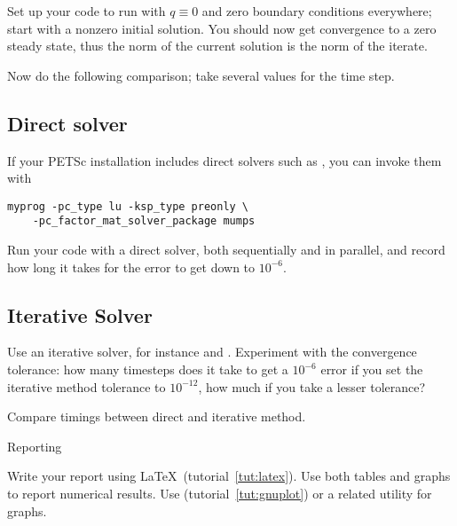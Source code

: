 Set up your code to run with $q\equiv0$ and zero boundary
  conditions everywhere; start with a nonzero initial solution. You
  should now get convergence to a zero steady state, thus the norm of
  the current solution is the norm of the iterate. 

Now do the following comparison; take several values for the time
step.

\subsection*{Direct solver}

If your PETSc installation includes direct solvers such as
, you can invoke them with
\begin{verbatim}
myprog -pc_type lu -ksp_type preonly \
    -pc_factor_mat_solver_package mumps 
\end{verbatim}
Run your code with a direct solver, both sequentially and in parallel,
and record how long it takes for the error to get down to $10^{-6}$.

\subsection*{Iterative Solver}

Use an iterative solver, for instance  and .
Experiment with the convergence tolerance: how many timesteps does it
take to get a $10^{-6}$ error if you set the iterative method
tolerance to $10^{-12}$, how much if you take a lesser tolerance?

Compare timings between direct and iterative method.

 {Reporting}

Write your report using \LaTeX\ (tutorial~\ref{tut:latex}). Use both
tables and graphs to report numerical results. Use \n{gnuplot}
(tutorial~\ref{tut:gnuplot}) or a related utility for graphs.

